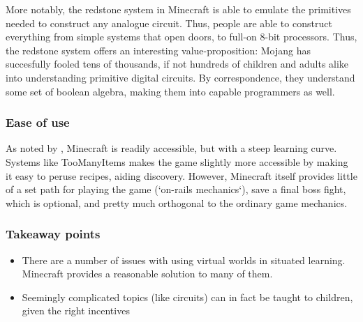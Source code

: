 More notably, the redstone system in Minecraft is able to emulate the primitives
needed to construct any analogue circuit. Thus, people are able to construct
everything from simple systems that open doors, to full-on 8-bit
processors\cite{minecraftutube}. Thus, the redstone system offers an interesting
value-proposition: Mojang has succesfully fooled tens of thousands, if not
hundreds of children and adults alike into understanding primitive digital
circuits. By correspondence, they understand some set of boolean algebra, making
them into capable programmers as well.

\subsubsection{Ease of use}

As noted by \cite{minecraftign}, Minecraft is readily accessible, but with a
steep learning curve. Systems like TooManyItems\cite{toomanyitems} makes the
game slightly more accessible by making it easy to peruse recipes, aiding
discovery. However, Minecraft itself provides little of a set path for playing
the game (`on-rails mechanics`), save a final boss fight, which is optional, and
pretty much orthogonal to the ordinary game mechanics.

\subsubsection{Takeaway points}

\begin{itemize}
\item There are a number of issues with using virtual worlds in situated
  learning. Minecraft provides a reasonable solution to many of them.
\item Seemingly complicated topics (like circuits) can in fact be taught to
  children, given the right incentives 
\end{itemize}
